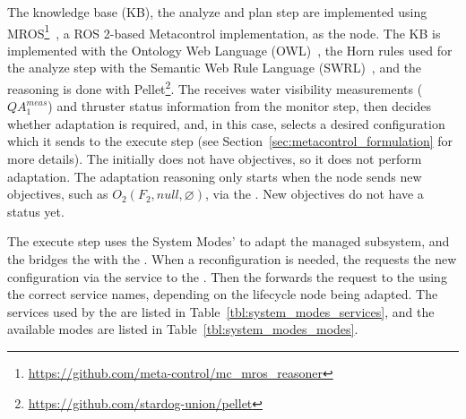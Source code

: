 The knowledge base (KB), the analyze and plan step are implemented using MROS\footnote{\url{https://github.com/meta-control/mc_mros_reasoner}}~\cite{bozhinoski2022mros}, a ROS 2-based Metacontrol implementation, as the  node. The KB
is implemented with the Ontology Web Language (OWL)~\cite{Antoniou2004}, the Horn rules used for the analyze step with the Semantic Web Rule Language (SWRL)~\cite{HorrocksPBTG2004}, and the reasoning is done with Pellet\footnote{\url{https://github.com/stardog-union/pellet}}. The  receives water visibility measurements ($QA_1^{meas}$) and thruster status information from the monitor step, then decides whether adaptation is required, and, in this case, selects a desired configuration which it sends to the execute step (see Section~\ref{sec:metacontrol_formulation} for more details). The  initially does not have objectives, so it does not perform adaptation. The adaptation reasoning only starts when the  node sends new objectives, such as $O_2(F_2, null , \varnothing)$, via the . New objectives do not have a status yet.

The execute step uses the System Modes'  to adapt the managed subsystem, and the  bridges the  with the . When a reconfiguration is needed, the  requests the new configuration via the  service to the . Then the  forwards the request to the  using the correct service names, depending on the lifecycle node being adapted. The services used by the  are listed in Table~\ref{tbl:system_modes_services}, and the available modes are listed in Table~\ref{tbl:system_modes_modes}.


